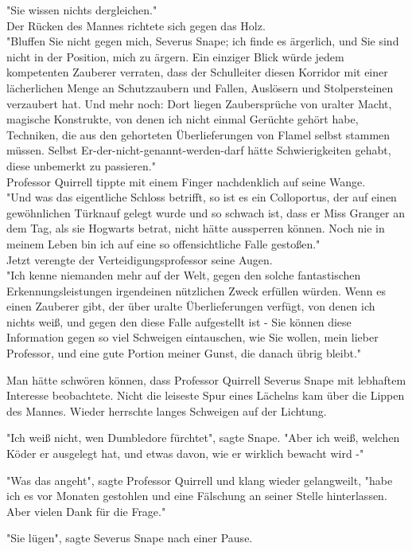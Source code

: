 {"Sie wissen nichts dergleichen."\\ Der Rücken des Mannes richtete sich gegen das Holz.\\ "Bluffen Sie nicht gegen mich, Severus Snape; ich finde es ärgerlich, und Sie sind nicht in der Position, mich zu ärgern. Ein einziger Blick würde jedem kompetenten Zauberer verraten, dass der Schulleiter diesen Korridor mit einer lächerlichen Menge an Schutzzaubern und Fallen, Auslösern und Stolpersteinen verzaubert hat. Und mehr noch: Dort liegen Zaubersprüche von uralter Macht, magische Konstrukte, von denen ich nicht einmal Gerüchte gehört habe, Techniken, die aus den gehorteten Überlieferungen von Flamel selbst stammen müssen. Selbst Er-der-nicht-genannt-werden-darf hätte Schwierigkeiten gehabt, diese unbemerkt zu passieren."\\ Professor Quirrell tippte mit einem Finger nachdenklich auf seine Wange.\\ "Und was das eigentliche Schloss betrifft, so ist es ein Colloportus, der auf einen gewöhnlichen Türknauf gelegt wurde und so schwach ist, dass er Miss Granger an dem Tag, als sie Hogwarts betrat, nicht hätte aussperren können. Noch nie in meinem Leben bin ich auf eine so offensichtliche Falle gestoßen."\\ Jetzt verengte der Verteidigungsprofessor seine Augen.\\ "Ich kenne niemanden mehr auf der Welt, gegen den solche fantastischen Erkennungsleistungen irgendeinen nützlichen Zweck erfüllen würden. Wenn es einen Zauberer gibt, der über uralte Überlieferungen verfügt, von denen ich nichts weiß, und gegen den diese Falle aufgestellt ist - Sie können diese Information gegen so viel Schweigen eintauschen, wie Sie wollen, mein lieber Professor, und eine gute Portion meiner Gunst, die danach übrig bleibt."

Man hätte schwören können, dass Professor Quirrell Severus Snape mit lebhaftem Interesse beobachtete. Nicht die leiseste Spur eines Lächelns kam über die Lippen des Mannes. Wieder herrschte langes Schweigen auf der Lichtung.

"Ich weiß nicht, wen Dumbledore fürchtet", sagte Snape. "Aber ich weiß, welchen Köder er ausgelegt hat, und etwas davon, wie er wirklich bewacht wird -"

"Was das angeht", sagte Professor Quirrell und klang wieder gelangweilt, "habe ich es vor Monaten gestohlen und eine Fälschung an seiner Stelle hinterlassen. Aber vielen Dank für die Frage."

"Sie lügen", sagte Severus Snape nach einer Pause.

}
